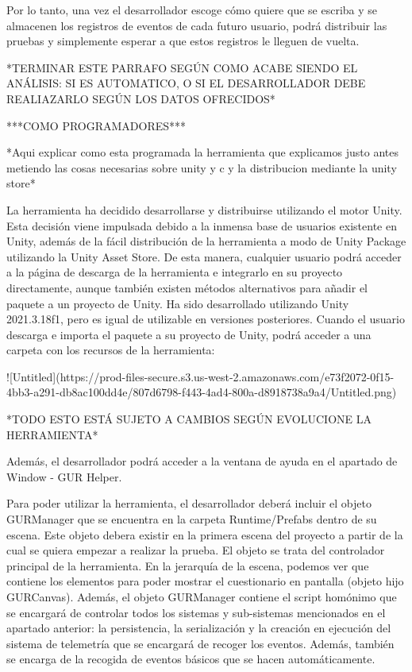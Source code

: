 Por lo tanto, una vez el desarrollador escoge cómo quiere que se escriba y se almacenen los registros de eventos de cada futuro usuario, podrá distribuir las pruebas y simplemente esperar a que estos registros le lleguen de vuelta. 

*TERMINAR ESTE PARRAFO SEGÚN COMO ACABE SIENDO EL ANÁLISIS: SI ES AUTOMATICO, O SI EL DESARROLLADOR DEBE REALIAZARLO SEGÚN LOS DATOS OFRECIDOS*

***COMO PROGRAMADORES***

*Aqui explicar como esta programada la herramienta que explicamos justo antes metiendo las cosas necesarias sobre unity y c y la distribucion mediante la unity store*

La herramienta ha decidido desarrollarse y distribuirse utilizando el motor Unity. Esta decisión viene impulsada debido a la inmensa base de usuarios existente en Unity, además de la fácil distribución de la herramienta a modo de Unity Package utilizando la Unity Asset Store. De esta manera, cualquier usuario podrá acceder a la página de descarga de la herramienta e integrarlo en su proyecto directamente, aunque también existen métodos alternativos para añadir el paquete a un proyecto de Unity. Ha sido desarrollado utilizando Unity 2021.3.18f1, pero es igual de utilizable en versiones posteriores. Cuando el usuario descarga e importa el paquete a su proyecto de Unity, podrá acceder a una carpeta con los recursos de la herramienta:

![Untitled](https://prod-files-secure.s3.us-west-2.amazonaws.com/e73f2072-0f15-4bb3-a291-db8ac100dd4e/807d6798-f443-4ad4-800a-d8918738a9a4/Untitled.png)

*TODO ESTO ESTÁ SUJETO A CAMBIOS SEGÚN EVOLUCIONE LA HERRAMIENTA*

Además, el desarrollador podrá acceder a la ventana de ayuda en el apartado de Window - GUR Helper. 

Para poder utilizar la herramienta, el desarrollador deberá incluir el objeto GURManager que se encuentra en la carpeta Runtime/Prefabs dentro de su escena. Este objeto debera existir en la primera escena del proyecto a partir de la cual se quiera empezar a realizar la prueba. El objeto se trata del controlador principal de la herramienta. En la jerarquía de la escena, podemos ver que contiene los elementos para poder mostrar el cuestionario en pantalla (objeto hijo GURCanvas). Además, el objeto GURManager contiene el script homónimo que se encargará de controlar todos los sistemas y sub-sistemas mencionados en el apartado anterior: la persistencia, la serialización y la creación en ejecución del sistema de telemetría que se encargará de recoger los eventos. Además, también se encarga de la recogida de eventos básicos que se hacen automáticamente.

